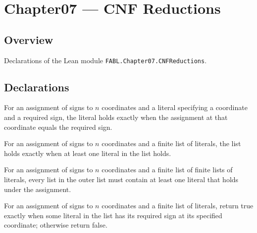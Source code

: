 \chapter{Chapter07 — CNF Reductions}
\section{Overview}

Declarations of the Lean module \texttt{FABL.Chapter07.CNFReductions}.

\section{Declarations}

\begin{definition}
\label{FABL.literalHolds}
\leanok
{}
For an assignment of signs to $n$ coordinates and a literal specifying a coordinate and
a required sign, the literal holds exactly when the assignment at that coordinate equals
the required sign.
\end{definition}

\begin{definition}
\label{FABL.literalListHolds}
\leanok
{}
For an assignment of signs to $n$ coordinates and a finite list of literals, the list
holds exactly when at least one literal in the list holds.
\end{definition}

\begin{definition}
\label{FABL.literalListsHold}
\leanok
{}
For an assignment of signs to $n$ coordinates and a finite list of finite lists of
literals, every list in the outer list must contain at least one literal that holds
under the assignment.
\end{definition}

\begin{definition}
\label{FABL.literalListHoldsDecision}
\leanok
{}
For an assignment of signs to $n$ coordinates and a finite list of literals, return true
exactly when some literal in the list has its required sign at its specified coordinate;
otherwise return false.
\end{definition}

